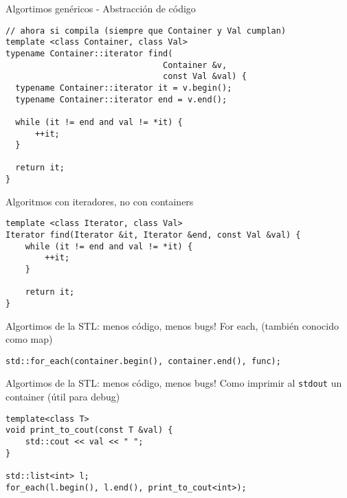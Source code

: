 \begin{frame}[fragile]{Algortimos gen\'ericos - Abstracci\'on de c\'odigo}
      \begin{lstlisting}[style=normal]
// ahora si compila (siempre que Container y Val cumplan)
template <class Container, class Val>
typename Container::iterator find(
                                Container &v, 
                                const Val &val) {
  typename Container::iterator it = v.begin();
  typename Container::iterator end = v.end();

  while (it != end and val != *it) {
      ++it;
  }

  return it;
}
      \end{lstlisting}
\end{frame}

\begin{frame}[fragile]{Algoritmos con iteradores, no con containers}
      \begin{lstlisting}[style=normal]
template <class Iterator, class Val>
Iterator find(Iterator &it, Iterator &end, const Val &val) {
    while (it != end and val != *it) {
        ++it;
    }

    return it;
}
      \end{lstlisting}
\end{frame}


\begin{frame}[fragile]{Algortimos de la STL: menos c\'odigo, menos bugs!}
For each, (tambi\'en conocido como map)
      \begin{lstlisting}[style=normal]
std::for_each(container.begin(), container.end(), func);
      \end{lstlisting}
\end{frame}

\begin{frame}[fragile]{Algortimos de la STL: menos c\'odigo, menos bugs!}
Como imprimir al \lstinline[style=normal]!stdout! un container (\'util para debug)
      \begin{lstlisting}[style=normal]
template<class T>
void print_to_cout(const T &val) {
    std::cout << val << " ";
}

std::list<int> l;
for_each(l.begin(), l.end(), print_to_cout<int>);
      \end{lstlisting}
\end{frame}

